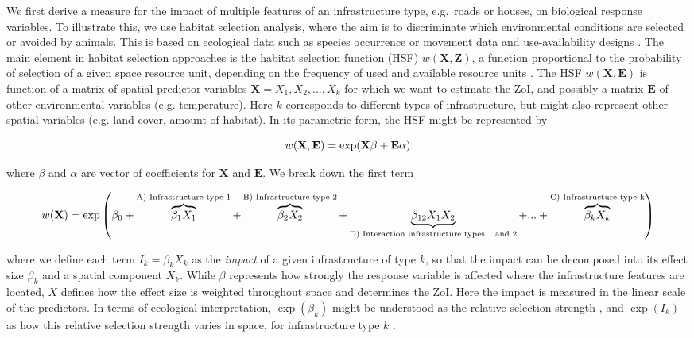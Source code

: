 \documentclass[titlepage]{article}
\begin{document}
We first derive a measure for the impact of multiple features of an infrastructure type, e.g.\ roads or houses, on biological response variables. To illustrate this, we use habitat selection analysis, where the aim is to discriminate which environmental conditions are selected or avoided by animals. This is based on ecological data such as species occurrence or movement data and use-availability designs \citep{fieberg_how_2021}. The main element in habitat selection approaches is the habitat selection function (HSF) $w(\textbf{X},\textbf{Z})$, a function proportional to the probability of selection of a given space resource unit, depending on the frequency of used and available resource units \citep{thurfjell_applications_2014}. The HSF $w(\textbf{X},\textbf{E})$ is function of a matrix of spatial predictor variables $\textbf{X} = X_1,X_2, ...,  X_k$ for which we want to estimate the ZoI, and possibly a matrix $\textbf{E}$ of other environmental variables (e.g. temperature). Here $k$ corresponds to different types of infrastructure, but might also represent other spatial variables (e.g. land cover, amount of habitat). In its parametric form, the HSF might be represented by

\begin{equation}
\centering
\label{eqn:HSFgeneral}
    w(\textbf{X},\textbf{E}) = \exp (\textbf{X} \beta + \textbf{E} \alpha)
\end{equation}

where $\beta$ and $\alpha$ are vector of coefficients for $\textbf{X}$ and $\textbf{E}$. We break down the first term

\begin{equation}
\centering
\label{eqn:HSF}
    w(\textbf{X}) %
                  = \exp \left( \beta_0 + \overbrace{\beta_1 X_1}^\text{A) Infrastructure type 1} + \overbrace{\beta_2 X_2}^\text{B) Infrastructure type 2} + \underbrace{\beta_{12} X_1 X_2}_\text{D) Interaction infrastructure types 1 and 2} + ... + \overbrace{\beta_k X_k}^\text{C) Infrastructure type k} \right)
\end{equation}

where we define each term $I_k = \beta_k X_k$ as the \textit{impact} of a given infrastructure of type $k$, so that the impact can be decomposed into its effect size $\beta_k$ and a spatial component $X_k$. While $\beta$ represents how strongly the response variable is affected where the infrastructure features are located, $X$ defines how the effect size is weighted throughout space and determines the ZoI. Here the impact is measured in the linear scale of the predictors. In terms of ecological interpretation, $\exp(\beta_k)$ might be understood as the relative selection strength \citep{avgar_relative_2017}, and $\exp(I_k)$ as how this relative selection strength varies in space, for infrastructure type $k$ \citep{fieberg_how_2021}.
\end{document}
